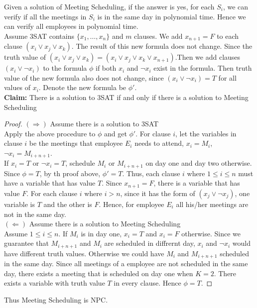 \documentclass[11pt]{article}
\begin{document}
\begin{enumerate}
Given a solution of {\sc Meeting Scheduling}, if the answer is yes, for each $S_i$, we can verify if all the 
meetings in $S_i$ is in the same day in polynomial time. Hence we can verify all employees in polynomial time.\\
Assume {\sc 3SAT} contains $\{x_1, \dots, x_n\}$ and $m$ clauses. We add $x_{n + 1} = F$ to each clause 
$(x_i \lor x_j \lor x_k)$. The result of this new formula does not change. Since the truth value of 
$(x_i \lor x_j \lor x_k) = (x_i \lor x_j \lor x_k \lor x_{n + 1})$.Then we add clauses $(x_i \lor \neg x_i)$ 
to the formula $\phi$ if both $x_i$ and $\neg x_i$ exist in the formula. Then truth value of the new formula 
also does not change, since $(x_i \lor \neg x_i) = T$ for all values of $x_i$. Denote the new formula be $\phi'$.\\
\textbf{Claim:} There is a solution to {\sc 3SAT} if and only if there is a solution to {\sc Meeting Scheduling}\\
\begin{proof}
    $(\Rightarrow)$ Assume there is a solution to {\sc 3SAT}\\
    Apply the above procedure to $\phi$ and get $\phi'$. For clause $i$, let the variables in clause $i$ 
    be the meetings that employee $E_i$ needs to attend, $x_i = M_i$, $\neg x_i = M_{i + n + 1}$.\\
    If $x_i = T$ or $\neg x_i = T$, schedule $M_i$ or $M_{i + n + 1}$ on day one and day two otherwise.\\
    Since $\phi = T$, by th proof above, $\phi' = T$. Thus, each clause $i$ where $1 \leq i \leq n$ must have 
    a variable that has value $T$. Since $x_{n + 1} = F$, there is a variable that has value $F$. For each 
    clause $i$ where $i > n$, since it has the form of $(x_j \lor \neg x_j)$, one variable is $T$ and the other 
    is $F$. Hence, for employee $E_i$ all his/her meetings are not in the same day. \\
    $(\Leftarrow)$ Assume there is a solution to {\sc Meeting Scheduling} \\
    Assume $1 \leq i \leq n$. If $M_i$ is in day one, $x_i = T$ and $x_i = F$ otherwise. Since we guarantee that 
    $M_{i + n + 1}$ and $M_{i}$ are scheduled in diffrernt day, $x_i$ and $\neg x_i$ would have different truth 
    values. Otherwise we could have $M_i$ and $M_{i + n + 1}$ scheduled in the same day. Since all meetings of 
    a employee are not scheduled in the same day, there exists a meeting that is scheduled on day one when 
    $K = 2$. There exists a variable with truth value $T$ in every clause. Hence $\phi = T$.
\end{proof}
Thus {\sc Meeting Scheduling} is NPC.

\end{enumerate}
\end{document}
